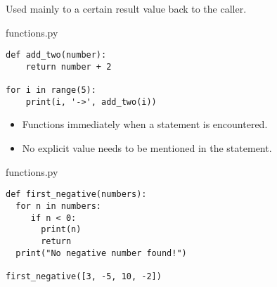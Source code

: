 \documentclass[aspectratio=1610,slidestop]{beamer}
\begin{document}
\begin{pframe}
 Used mainly to  a certain result value back to the caller.
 \medskip

 \begin{minipage}[t]{0.47\textwidth}
  \begin{pythonfile}{functions.py}
   \begin{verbatim}
def add_two(number):
    return number + 2

for i in range(5):
    print(i, '->', add_two(i))
   \end{verbatim}
  \end{pythonfile}
 \end{minipage}\qquad
 \pause
 \begin{minipage}[t]{0.47\textwidth}
 \vspace{-3.05cm}
 \begin{terminal}
 \end{terminal}
 \end{minipage}
\end{pframe}


\begin{pframe}
 \begin{itemize}
  \item Functions immediately  when a  statement is encountered.
  \item No explicit value needs to be mentioned in the  statement.
 \end{itemize}
 \pause
 \medskip

 \begin{minipage}[t]{0.49\textwidth}
  \begin{pythonfile}{functions.py}
   \begin{verbatim}
def first_negative(numbers):
  for n in numbers:
     if n < 0:
       print(n)
       return
  print("No negative number found!")

first_negative([3, -5, 10, -2])
   \end{verbatim}
  \end{pythonfile}
 \end{minipage}\qquad
 \pause
 \begin{minipage}[t]{0.45\textwidth}
 \vspace{-4.15cm}
 \begin{terminal}
 \end{terminal}
 \end{minipage}
\end{pframe}
\end{document}
